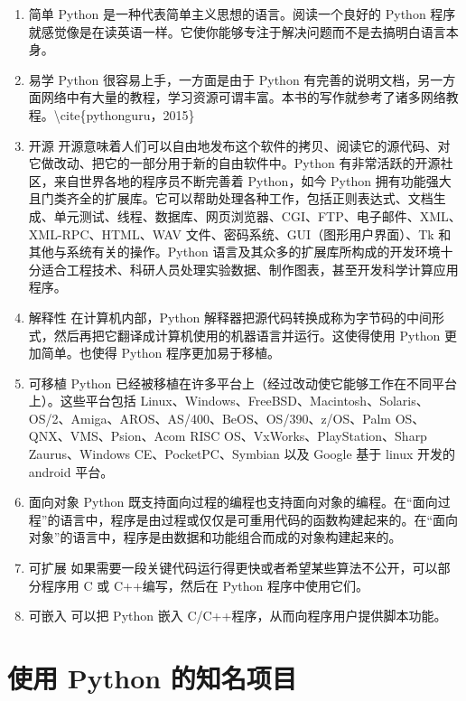 \documentclass[]{ctexbook}
\providecommand{\tightlist}{%
  \setlength{\itemsep}{0pt}\setlength{\parskip}{0pt}}
\begin{document}
\begin{enumerate}
\def\labelenumi{\arabic{enumi}.}
\tightlist
\item
  简单 Python 是一种代表简单主义思想的语言。阅读一个良好的 Python 程序就感觉像是在读英语一样。它使你能够专注于解决问题而不是去搞明白语言本身。
\item
  易学 Python 很容易上手，一方面是由于 Python 有完善的说明文档，另一方面网络中有大量的教程，学习资源可谓丰富。本书的写作就参考了诸多网络教程。\textbackslash cite\{pythonguru，2015\}
\item
  开源 开源意味着人们可以自由地发布这个软件的拷贝、阅读它的源代码、对它做改动、把它的一部分用于新的自由软件中。Python 有非常活跃的开源社区，来自世界各地的程序员不断完善着 Python，如今 Python 拥有功能强大且门类齐全的扩展库。它可以帮助处理各种工作，包括正则表达式、文档生成、单元测试、线程、数据库、网页浏览器、CGI、FTP、电子邮件、XML、XML-RPC、HTML、WAV 文件、密码系统、GUI（图形用户界面）、Tk 和其他与系统有关的操作。Python 语言及其众多的扩展库所构成的开发环境十分适合工程技术、科研人员处理实验数据、制作图表，甚至开发科学计算应用程序。
\item
  解释性 在计算机内部，Python 解释器把源代码转换成称为字节码的中间形式，然后再把它翻译成计算机使用的机器语言并运行。这使得使用 Python 更加简单。也使得 Python 程序更加易于移植。
\item
  可移植 Python 已经被移植在许多平台上（经过改动使它能够工作在不同平台上）。这些平台包括 Linux、Windows、FreeBSD、Macintosh、Solaris、OS/2、Amiga、AROS、AS/400、BeOS、OS/390、z/OS、Palm OS、QNX、VMS、Psion、Acom RISC OS、VxWorks、PlayStation、Sharp Zaurus、Windows CE、PocketPC、Symbian 以及 Google 基于 linux 开发的 android 平台。
\item
  面向对象 Python 既支持面向过程的编程也支持面向对象的编程。在``面向过程''的语言中，程序是由过程或仅仅是可重用代码的函数构建起来的。在``面向对象''的语言中，程序是由数据和功能组合而成的对象构建起来的。
\item
  可扩展 如果需要一段关键代码运行得更快或者希望某些算法不公开，可以部分程序用 C 或 C++编写，然后在 Python 程序中使用它们。
\item
  可嵌入 可以把 Python 嵌入 C/C++程序，从而向程序用户提供脚本功能。
\end{enumerate}

\hypertarget{ux4f7fux7528-python-ux7684ux77e5ux540dux9879ux76ee}{%
\section{使用 Python 的知名项目}\label{ux4f7fux7528-python-ux7684ux77e5ux540dux9879ux76ee}}
\end{document}
